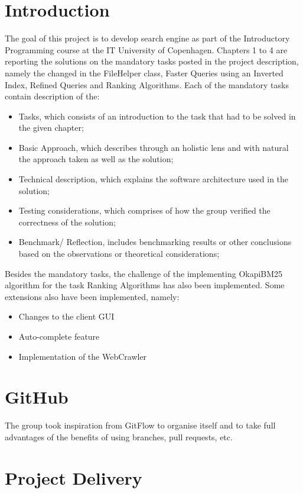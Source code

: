 \section{Introduction}
\label{sec:Introduction}
The goal of this project is to develop search engine as part of the Introductory Programming course at the IT University of Copenhagen. Chapters 1 to 4 are reporting the solutions on the mandatory tasks posted in the project description, namely the changed in the FileHelper class, Faster Queries using an Inverted Index, Refined Queries and Ranking Algorithms. Each of the mandatory tasks contain description of the:
\begin{itemize}
    \item Tasks, which consists of an introduction to the task that had to be solved in the given chapter;
    \item Basic Approach, which describes through an holistic lens and with natural the approach taken as well as the solution;
    \item Technical description, which explains the software architecture used in the solution;
    \item Testing considerations, which comprises of how the group verified the correctness of the solution;
    \item  Benchmark/ Reflection, includes benchmarking results or other conclusions based on the observations or theoretical considerations;
\end{itemize}

Besides the mandatory tasks, the challenge of the implementing OkapiBM25 algorithm for the task Ranking Algorithms has also been implemented. Some extensions also have been implemented, namely:
\begin{itemize}
    \item Changes to the client GUI
    \item Auto-complete feature
    \item Implementation of the WebCrawler
\end{itemize}

\section{GitHub}
\label{sec:GitHub}
The group took inspiration from GitFlow to organise itself and to take full advantages of the benefits of using branches, pull requests, etc.

\section{Project Delivery}
\label{sec:Project Delivery}

